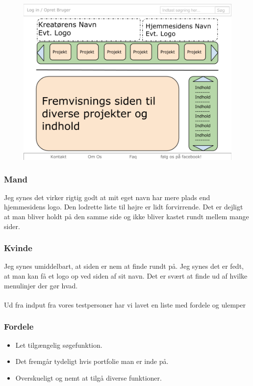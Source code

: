 \documentclass[a4paper,titlepage,fleqn,12pt]{article}
\begin{document}
\begin{figure}[H]
	\includegraphics[width=\textwidth]{hjemmesidedesign1.png}
	
\end{figure}

\subsubsection{Mand}
Jeg synes det virker rigtig godt at mit eget navn har mere plads end hjemmesidens logo. Den lodrette liste til højre er lidt forvirrende. Det er dejligt at man bliver holdt på den samme side og ikke bliver kastet rundt mellem mange sider.

\subsubsection{Kvinde}
Jeg synes umiddelbart, at siden er nem at finde rundt på. Jeg synes det er fedt, at man kan få et logo op ved siden af sit navn. Det er svært at finde ud af hvilke menulinjer der gør hvad.\\\\
Ud fra indput fra vores testpersoner har vi lavet en liste med fordele og ulemper

\subsubsection{Fordele}

\begin{itemize}
	\item Let tilgængelig søgefunktion.
	\item Det fremgår tydeligt hvis portfolie man er inde på.
	\item Overskueligt og nemt at tilgå diverse funktioner.
\end{itemize}
\end{document}

